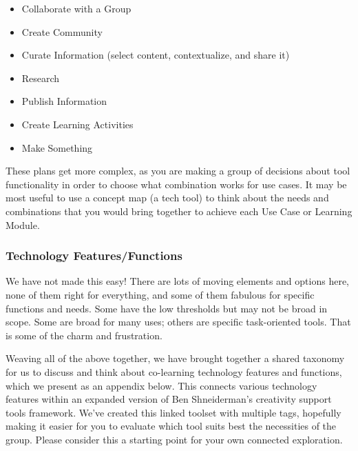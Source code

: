\begin{itemize}
\item
  Collaborate with a Group
\end{itemize}

\begin{itemize}
\item
  Create Community
\end{itemize}

\begin{itemize}
\item
  Curate Information (select content, contextualize, and share it)
\end{itemize}

\begin{itemize}
\item
  Research
\end{itemize}

\begin{itemize}
\item
  Publish Information
\end{itemize}

\begin{itemize}
\item
  Create Learning Activities
\end{itemize}

\begin{itemize}
\item
  Make Something
\end{itemize}

These plans get more complex, as you are making a group of decisions
about tool functionality in order to choose what combination works for
use cases. It may be most useful to use a concept map (a tech tool) to
think about the needs and combinations that you would bring together to
achieve each Use Case or Learning Module.

\subsubsection{Technology Features/Functions}

We have not made this easy! There are lots of moving elements and
options here, none of them right for everything, and some of them
fabulous for specific functions and needs. Some have the low thresholds
but may not be broad in scope. Some are broad for many uses; others are
specific task-oriented tools. That is some of the charm and frustration.

Weaving all of the above together, we have brought together a shared
taxonomy for us to discuss and think about co-learning technology
features and functions, which we present as an appendix below. This
connects various technology features within an expanded version of Ben
Shneiderman's creativity support tools framework. We've created this
linked toolset with multiple tags, hopefully making it easier for you to
evaluate which tool suits best the necessities of the group. Please
consider this a starting point for your own connected exploration.

